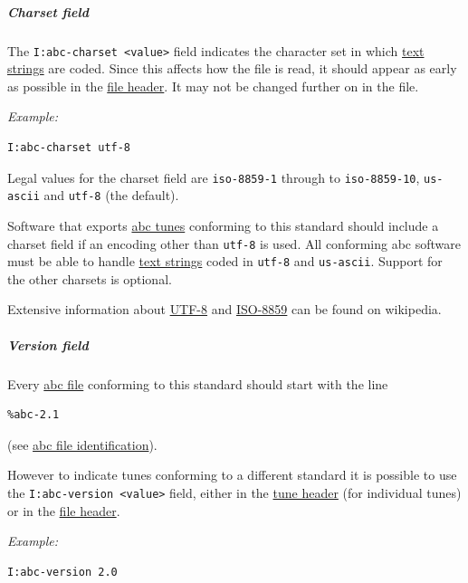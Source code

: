 \documentclass[oneside]{book}
\let\oldsubparagraph\subparagraph
\renewcommand{\subparagraph}[1]{\oldsubparagraph{#1}\mbox{}}
\begin{document}
\hypertarget{charset_field}{\subparagraph{Charset
field}\label{charset_field}}

The \texttt{I:abc-charset\ \textless{}value\textgreater{}} field
indicates the character set in which
\protect\hyperlink{text_string_definition}{text strings} are coded.
Since this affects how the file is read, it should appear as early as
possible in the \protect\hyperlink{file_header_definition}{file header}.
It may not be changed further on in the file.

\emph{Example:}

\begin{verbatim}
I:abc-charset utf-8
\end{verbatim}

Legal values for the charset field are \texttt{iso-8859-1} through to
\texttt{iso-8859-10}, \texttt{us-ascii} and \texttt{utf-8} (the
default).

Software that exports \protect\hyperlink{abc_tune_definition}{abc tunes}
conforming to this standard should include a charset field if an
encoding other than \texttt{utf-8} is used. All conforming abc software
must be able to handle \protect\hyperlink{text_string_definition}{text
strings} coded in \texttt{utf-8} and \texttt{us-ascii}. Support for the
other charsets is optional.

Extensive information about
\href{http://en.wikipedia.org/wiki/UTF-8}{UTF-8} and
\href{http://en.wikipedia.org/wiki/ISO/IEC_8859}{ISO-8859} can be found
on wikipedia.

\hypertarget{version_field}{\subparagraph{Version
field}\label{version_field}}

Every \protect\hyperlink{abc_file_definition}{abc file} conforming to
this standard should start with the line

\begin{verbatim}
%abc-2.1
\end{verbatim}

(see \protect\hyperlink{abc_file_identification}{abc file
identification}).

However to indicate tunes conforming to a different standard it is
possible to use the
\texttt{I:abc-version\ \textless{}value\textgreater{}} field, either in
the \protect\hyperlink{tune_header_definition}{tune header} (for
individual tunes) or in the
\protect\hyperlink{file_header_definition}{file header}.

\emph{Example:}

\begin{verbatim}
I:abc-version 2.0
\end{verbatim}
\end{document}
